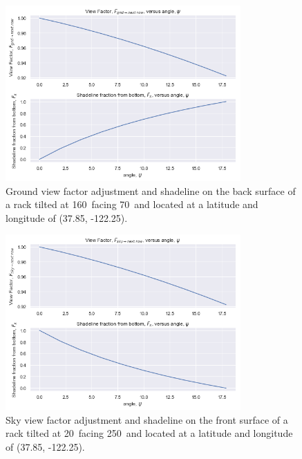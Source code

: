 \documentclass[conference]{IEEEtran}
\begin{document}
\begin{figure}
\centering
\includegraphics[width=9cm]{ground_diffuse_back_w-next_row.png}
\caption{Ground view factor adjustment and shadeline on the back surface of a rack tilted at 160\degree\ facing 70\degree\ and located at a latitude and longitude of (37.85\degree, -122.25\degree).}
\label{fig:gnd-back-nextrow}
\end{figure}

\begin{figure}
\centering
\includegraphics[width=9cm]{sky_diffuse_front_w-next_row.png}
\caption{Sky view factor adjustment and shadeline on the front surface of a rack tilted at 20\degree\ facing 250\degree\ and located at a latitude and longitude of (37.85\degree, -122.25\degree).}
\label{fig:sky-front-nextrow}
\end{figure}
\end{document}
